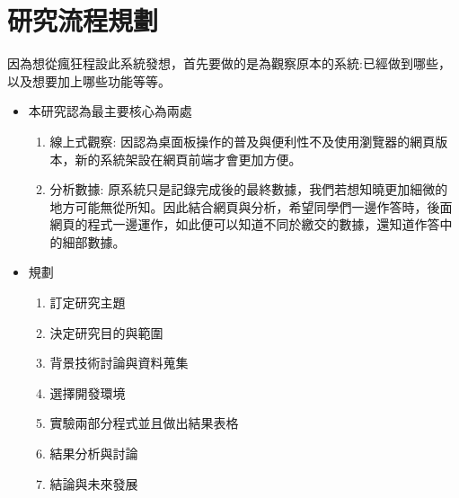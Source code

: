 \section{研究流程規劃}

因為想從瘋狂程設此系統發想，首先要做的是為觀察原本的系統:已經做到哪些，以及想要加上哪些功能等等。

\begin{itemize}%
	\item 本研究認為最主要核心為兩處
		\begin{enumerate}[1.]%
			\item 線上式觀察:
			因認為桌面板操作的普及與便利性不及使用瀏覽器的網頁版本，新的系統架設在網頁前端才會更加方便。
			\item 分析數據:
			原系統只是記錄完成後的最終數據，我們若想知曉更加細微的地方可能無從所知。因此結合網頁與分析，希望同學們一邊作答時，後面網頁的程式一邊運作，如此便可以知道不同於繳交的數據，還知道作答中的細部數據。
		\end{enumerate}

	\item 規劃
		\begin{enumerate}[1.]
			\item 訂定研究主題
			\item 決定研究目的與範圍
			\item 背景技術討論與資料蒐集
			\item 選擇開發環境
			\item 實驗兩部分程式並且做出結果表格
			\item 結果分析與討論
			\item 結論與未來發展
		\end{enumerate}
\end{itemize}
\newpage
